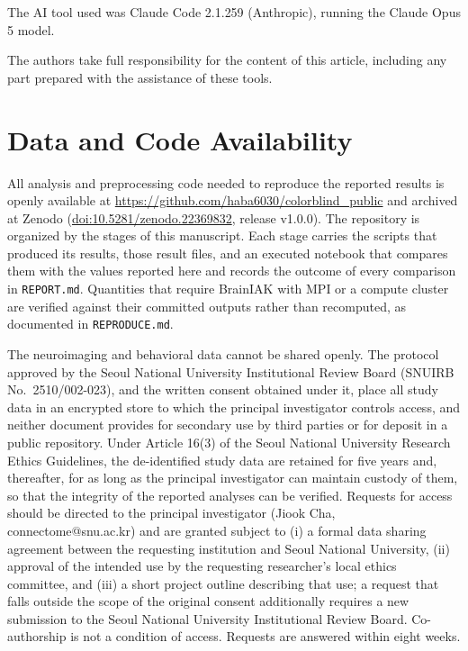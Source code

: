 \documentclass{imag-ms-template}
\providecommand{\doi}[1]{\href{https://doi.org/#1}{doi:#1}}
\begin{document}
The AI tool used was Claude Code 2.1.259 (Anthropic), running the Claude Opus 5
model.

The authors take full responsibility for the content of this article, including
any part prepared with the assistance of these tools.

\section*{Data and Code Availability}

All analysis and preprocessing code needed to reproduce the reported results is
openly available at \url{https://github.com/haba6030/colorblind_public} and
archived at Zenodo (\doi{10.5281/zenodo.22369832}, release v1.0.0). The
repository is organized by the stages of this manuscript. Each stage carries the
scripts that produced its results, those result files, and an executed notebook
that compares them with the values reported here and records the outcome of
every comparison in \texttt{REPORT.md}. Quantities that require BrainIAK with
MPI or a compute cluster are verified against their committed outputs rather
than recomputed, as documented in \texttt{REPRODUCE.md}.


The neuroimaging and behavioral data cannot be shared openly. The protocol
approved by the Seoul National University Institutional Review Board (SNUIRB
No.~2510/002-023), and the written consent obtained under it, place all study
data in an encrypted store to which the principal investigator controls access,
and neither document provides for secondary use by third parties or for deposit
in a public repository. Under Article 16(3) of the Seoul National University
Research Ethics Guidelines, the de-identified study data are retained for five
years and, thereafter, for as long as the principal investigator can maintain
custody of them, so that the integrity of the reported analyses can be verified.
Requests for access should be directed to the principal investigator (Jiook Cha,
connectome@snu.ac.kr) and are granted subject to (i) a formal data sharing
agreement between the requesting institution and Seoul National University,
(ii) approval of the intended use by the requesting researcher's local ethics
committee, and (iii) a short project outline describing that use; a request that
falls outside the scope of the original consent additionally requires a new
submission to the Seoul National University Institutional Review Board.
Co-authorship is not a condition of access. Requests are answered within eight
weeks.
\end{document}
